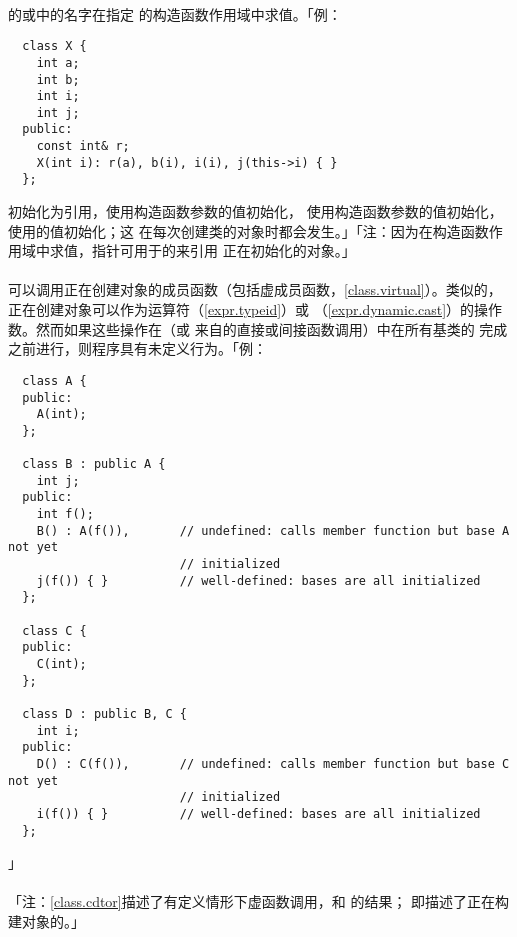 \paragraph{}
的或中的名字在指定
的构造函数作用域中求值。「例：
\begin{lstlisting}
  class X {
    int a;
    int b;
    int i;
    int j;
  public:
    const int& r;
    X(int i): r(a), b(i), i(i), j(this->i) { }
  };
\end{lstlisting}
初始化为引用，使用构造函数参数的值初始化，
使用构造函数参数的值初始化，使用的值初始化；这
在每次创建类的对象时都会发生。」「注：因为在构造函数作
用域中求值，指针可用于的来引用
正在初始化的对象。」

\paragraph{}
可以调用正在创建对象的成员函数（包括虚成员函数，\ref{class.virtual}）。类似的，
正在创建对象可以作为运算符（\ref{expr.typeid}）或
（\ref{expr.dynamic.cast}）的操作数。然而如果这些操作在（或
来自的直接或间接函数调用）中在所有基类的
完成之前进行，则程序具有未定义行为。「例：
\begin{lstlisting}
  class A {
  public:
    A(int);
  };

  class B : public A {
    int j;
  public:
    int f();
    B() : A(f()),       // undefined: calls member function but base A not yet
                        // initialized
    j(f()) { }          // well-defined: bases are all initialized
  };

  class C {
  public:
    C(int);
  };

  class D : public B, C {
    int i;
  public:
    D() : C(f()),       // undefined: calls member function but base C not yet
                        // initialized
    i(f()) { }          // well-defined: bases are all initialized
  };
\end{lstlisting}」

\paragraph{}
「注：\ref{class.cdtor}描述了有定义情形下虚函数调用，和
的结果； 即描述了正在构建对象的。」

